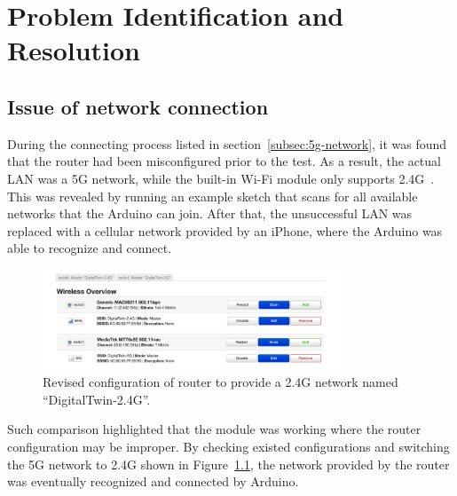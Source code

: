 \chapter{Problem Identification and Resolution}


\section{Issue of network connection}

During the connecting process listed in section~\ref{subsec:5g-network}, it was found that the router had been misconfigured prior to the test.
As a result, the actual LAN was a 5G network, while the built-in Wi-Fi module only supports 2.4G~\cite{arduino_nina_w10_datasheet}.
This was revealed by running an example sketch that scans for all available networks that the Arduino can join.
After that, the unsuccessful LAN was replaced with a cellular network provided by an iPhone, where the Arduino was able to recognize and connect.

\begin{figure}[htbp]
	\centering
	\includegraphics[width=0.8\textwidth]{
		fileForWriting/config}
	\caption[Revised configuration of router]{Revised configuration of router to provide a 2.4G network named ``DigitalTwin-2.4G''.}
	\label{fig:config-5G}
\end{figure}

Such comparison highlighted that the module was working where the router configuration may be improper.
By checking existed configurations and switching the 5G network to 2.4G shown in Figure~\ref{fig:config-5G}, the network provided by the router was eventually recognized and connected by Arduino.

